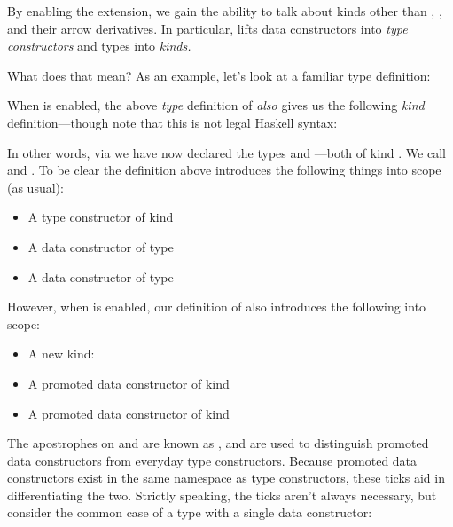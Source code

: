 \documentclass[book.tex]{subfiles}
\begin{document}
By enabling the  extension, we gain the ability to talk about
kinds other than , , and their arrow derivatives. In
particular,  lifts data constructors into \emph{type
constructors} and types into \emph{kinds.}

What does that mean? As an example, let's look at a familiar type definition:


When  is enabled, the above \emph{type} definition of 
\emph{also} gives us the following \emph{kind} definition---though note that
this is not legal Haskell syntax:


In other words, via  we have now declared the types 
and ---both of kind . We call  and 
. To be clear the
 definition above introduces the following things into scope (as
usual):

\begin{itemize}
  \item{A type constructor  of kind }
  \item{A data constructor  of type }
  \item{A data constructor  of type }
\end{itemize}

However, when  is enabled, our definition of  also
introduces the following into scope:

\begin{itemize}
  \item{A new kind: }
  \item{A promoted data constructor  of kind }
  \item{A promoted data constructor  of kind }
\end{itemize}

The apostrophes on  and  are known as ,
and are used to distinguish promoted data constructors from everyday type
constructors.  Because promoted data constructors exist in the same namespace as
type constructors, these ticks aid in differentiating the two. Strictly
speaking, the ticks aren't always necessary, but consider the common case of a
type with a single data constructor:
\end{document}
